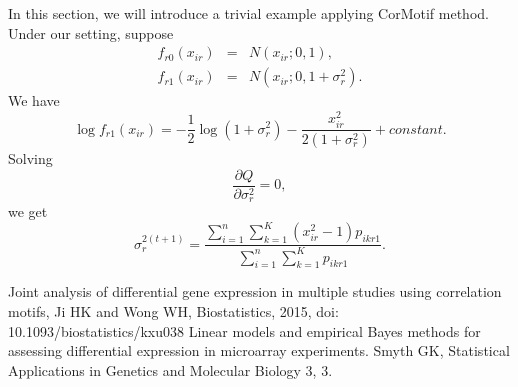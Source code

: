 \documentclass[11pt, oneside]{article}   	%
\begin{document}
In this section, we will introduce a trivial example applying CorMotif method. Under our setting, suppose
\begin{eqnarray*}
f_{r0}(x_{ir}) &=& N(x_{ir};0,1), \\
f_{r1}(x_{ir}) &=& N(x_{ir};0,1+\sigma_r^2).
\end{eqnarray*}
We have
 $$\log f_{r1}(x_{ir})  = -\frac{1}{2} \log(1+\sigma_r^2)-\frac{x_{ir}^2}{2(1+\sigma_r^2)}+constant.$$
 Solving 
$$\frac{\partial Q}{\partial \sigma_r^2} =0 , $$
we get
$$\sigma_r^{2(t+1)}= \frac{\sum_{i=1}^n \sum_{k=1}^K (x_{ir}^2-1)p_{ikr1}}{\sum_{i=1}^n \sum_{k=1}^K p_{ikr1}}.$$

\begin{thebibliography}{2015}
 Joint analysis of differential gene expression in multiple studies using correlation motifs, Ji HK and Wong WH, Biostatistics, 2015, doi: 10.1093/biostatistics/kxu038 
 Linear models and empirical Bayes methods for assessing differential expression in microarray experiments. Smyth GK, Statistical Applications in Genetics and Molecular Biology 3, 3.
\end{thebibliography}
\end{document}
